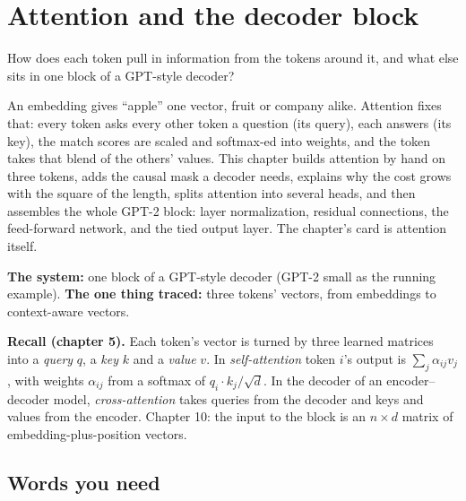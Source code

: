 \chapter{Attention and the decoder block}
\label{ch:att}

\begin{question}
How does each token pull in information from the tokens around it, and what else sits in one block of a GPT-style decoder?
\end{question}

\begin{whatfor}
An embedding gives ``apple'' one vector, fruit or company alike. Attention fixes that: every token asks every other token a question (its query), each answers (its key), the match scores are scaled and softmax-ed into weights, and the token takes that blend of the others' values. This chapter builds attention by hand on three tokens, adds the causal mask a decoder needs, explains why the cost grows with the square of the length, splits attention into several heads, and then assembles the whole GPT-2 block: layer normalization, residual connections, the feed-forward network, and the tied output layer. The chapter's card is attention itself.
\end{whatfor}

\begin{setup}
\textbf{The system:} one block of a GPT-style decoder (GPT-2 small as the running example).
\textbf{The one thing traced:} three tokens' vectors, from embeddings to context-aware vectors.
\end{setup}

\begin{recall}
\textbf{Recall (chapter 5).} Each token's vector is turned by three learned matrices into a \emph{query} $q$, a \emph{key} $k$ and a \emph{value} $v$. In \emph{self-attention} token $i$'s output is $\sum_j \alpha_{ij} v_j$, with weights $\alpha_{ij}$ from a softmax of $q_i\cdot k_j/\sqrt d$. In the decoder of an encoder--decoder model, \emph{cross-attention} takes queries from the decoder and keys and values from the encoder. Chapter 10: the input to the block is an $n \times d$ matrix of embedding-plus-position vectors.
\end{recall}

\section{Words you need}

